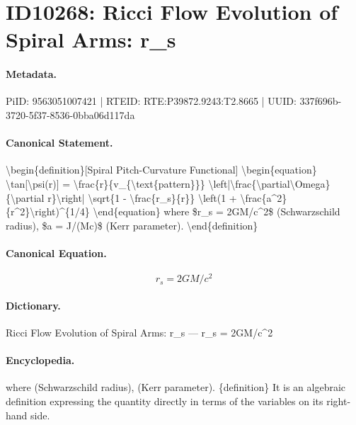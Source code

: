 \section*{ID10268: Ricci Flow Evolution of Spiral Arms: r\_s}
\paragraph{Metadata.}
PiID: 9563051007421 | RTEID: RTE:P39872.9243:T2.8665 | UUID: 337f696b-3720-5f37-8536-0bba06d117da

\paragraph{Canonical Statement.}
\textbackslash{}begin\{definition\}[Spiral Pitch-Curvature Functional] \textbackslash{}begin\{equation\} \textbackslash{}tan[\textbackslash{}psi(r)] = \textbackslash{}frac\{r\}\{v\_\{\textbackslash{}text\{pattern\}\}\} \textbackslash{}left|\textbackslash{}frac\{\textbackslash{}partial\textbackslash{}Omega\}\{\textbackslash{}partial r\}\textbackslash{}right| \textbackslash{}sqrt\{1 - \textbackslash{}frac\{r\_s\}\{r\}\} \textbackslash{}left(1 + \textbackslash{}frac\{a\textasciicircum{}2\}\{r\textasciicircum{}2\}\textbackslash{}right)\textasciicircum{}\{1/4\} \textbackslash{}end\{equation\} where \$r\_s = 2GM/c\textasciicircum{}2\$ (Schwarzschild radius), \$a = J/(Mc)\$ (Kerr parameter). \textbackslash{}end\{definition\}

\paragraph{Canonical Equation.}
\[
r_s = 2GM/c^2
\]

\paragraph{Dictionary.}
Ricci Flow Evolution of Spiral Arms: r\_s — r\_s = 2GM/c\textasciicircum{}2

\paragraph{Encyclopedia.}
where (Schwarzschild radius), (Kerr parameter). \{definition\} It is an algebraic definition expressing the quantity directly in terms of the variables on its right-hand side.

